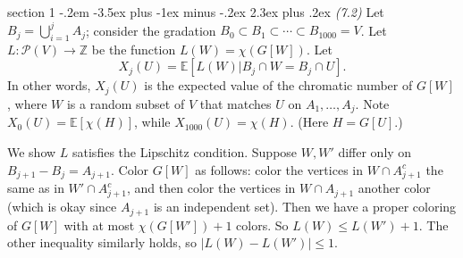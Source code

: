 \documentclass[12pt]{article}
\makeatletter
\theoremstyle{norm}
\newcommand{\E}[0]{\mathbb{E}}
\newcommand{\Z}[0]{\mathbb{Z}}
\providecommand{\cal}[1]{\mathcal{#1}}
\renewcommand{\cal}[1]{\mathcal{#1}}
\newcommand{\rc}[1]{\frac{1}{#1}}
\newcommand{\sub}[0]{\subset}
\newcommand{\subeq}[0]{\subseteq}
\newcommand{\ba}[1]{\left[ {#1} \right]}
\newcommand{\pa}[1]{\left( {#1} \right)}
\newenvironment{problem}{\@startsection
       {section}
       {1}
       {-.2em}
       {-3.5ex plus -1ex minus -.2ex}
       {2.3ex plus .2ex}
       {\pagebreak[3]%
       \large\bf\noindent{Problem }
       }
       }
       {%
       }
\makeatother
\begin{document}
\begin{problem} {\it (7.2)}
Let $B_j=\bigcup_{i=1}^j A_j$; consider the gradation $B_0\sub B_1\sub\cdots\sub B_{1000}=V$. Let $L:\cal P(V)\to \Z$ be the function $L(W)=\chi(G[W])$. Let 
\[
X_j(U)=\E[L(W)|B_j\cap W=B_j\cap U].
\]
In other words, $X_j(U)$ is the expected value of the chromatic number of $G[W]$, where $W$ is a random subset of $V$ that matches $U$ on $A_1,\ldots, A_j$. Note $X_0(U)=\E[\chi(H)]$, while $X_{1000}(U)=\chi(H)$. (Here $H=G[U]$.)

We show $L$ satisfies the Lipschitz condition. Suppose $W,W'$ differ only on $B_{j+1}-B_j=A_{j+1}$. Color $G[W]$ as follows: color the vertices in $W\cap A_{j+1}^c$ the same as in $W'\cap A_{j+1}^c$, and then color the vertices in $W\cap A_{j+1}$ another color (which is okay since $A_{j+1}$ is an independent set). Then we have a proper coloring of $G[W]$ with at most $\chi(G[W'])+1$ colors. So $L(W)\le L(W')+1$. The other inequality similarly holds, so $|L(W)-L(W')|\le 1$.


\end{problem}
\end{document}
